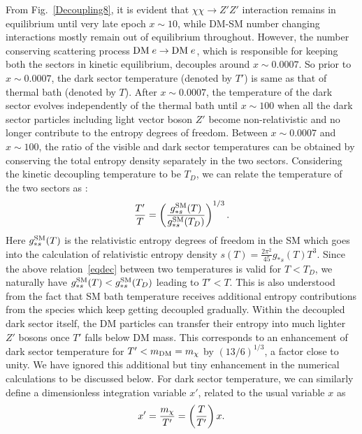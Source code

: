 \documentclass[prd,nofootinbib,preprint,superscriptaddress]{revtex4}
\begin{document}
		From Fig.~\ref{Decoupling8}, it is evident that $\chi \chi \to Z'Z'$ interaction remains in equilibrium until very late epoch $x \sim 10$, while DM-SM number changing interactions mostly remain out of equilibrium throughout. However, the number conserving scattering process ${\rm DM} \; e \rightarrow {\rm DM} \; e$, which is responsible for keeping both the sectors in kinetic equilibrium, decouples around $x \sim 0.0007$. So prior to $x \sim 0.0007$, the dark sector temperature (denoted by $T'$) is same as that of thermal bath (denoted by $T$).  After $x \sim 0.0007$, the temperature of the dark sector evolves independently of the thermal bath until $x \sim 100$ when all the dark sector particles including light vector boson $Z'$ become non-relativistic and no longer contribute to the entropy degrees of freedom. Between $x \sim 0.0007$ and $x \sim 100$, the ratio of the visible and dark sector temperatures can be obtained by conserving the total entropy density separately in the two sectors. Considering the kinetic decoupling temperature to be $T_D$, we can relate the temperature of the two sectors as : 
		\begin{equation}
			\frac{T'}{T} = \left( \frac{g^{\rm SM}_{*s} (T)}{g^{\rm SM}_{*s} (T_D)} \right)^{1/3}.
			\label{eqdec}
		\end{equation}
		Here $g^{\rm SM}_{*s} (T)$ is the relativistic entropy degrees of freedom in the SM which goes into the calculation of relativistic entropy density $s(T)=\frac{2\pi^2}{45}g_{*s}(T)T^3$. Since the above relation~\eqref{eqdec} between two temperatures is valid for $T<T_D$, we naturally have $g^{\rm SM}_{*s} (T) < g^{\rm SM}_{*s} (T_D)$ leading to $T'< T$. This is also understood from the fact that SM bath temperature receives additional entropy contributions from the species which keep getting decoupled gradually. Within the decoupled dark sector itself, the DM particles can transfer their entropy into much lighter $Z'$ bosons once $T'$ falls below DM mass. This corresponds to an enhancement of dark sector temperature for $T'< m_{\rm DM}=m_{\chi}$ by $(13/6)^{1/3}$, a factor close to unity. We have ignored this additional but tiny enhancement in the numerical calculations to be discussed below. For dark sector temperature, we can similarly define a dimensionless integration variable $x'$, related to the usual variable $x$ as 
		\begin{equation}
			x'=\frac{m_{\rm \chi}}{T'}=\left (\frac{T}{T'}\right ) x.
		\end{equation}
		
\end{document}
